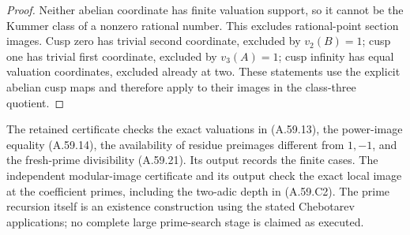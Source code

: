 \begin{proof}
Neither abelian coordinate has finite
valuation support, so it cannot be the
Kummer class of a nonzero rational number.
This excludes rational-point section images.
Cusp zero has trivial second coordinate,
excluded by $v_2(B)=1$; cusp one has
trivial first coordinate, excluded by
$v_3(A)=1$; cusp infinity has equal
valuation coordinates, excluded already
at two. These statements use the explicit
abelian cusp maps and therefore apply to
their images in the class-three quotient.
\end{proof}

The retained certificate
checks the exact valuations in (A.59.13), the
power-image equality (A.59.14), the availability
of residue preimages different from $1,-1$,
and the fresh-prime divisibility (A.59.21).
Its output records the finite cases.
The independent modular-image certificate
and its output check the exact local image at
the coefficient primes, including the two-adic
depth in (A.59.C2).
The prime recursion itself is an existence
construction using the stated Chebotarev
applications; no complete large prime-search
stage is claimed as executed.
